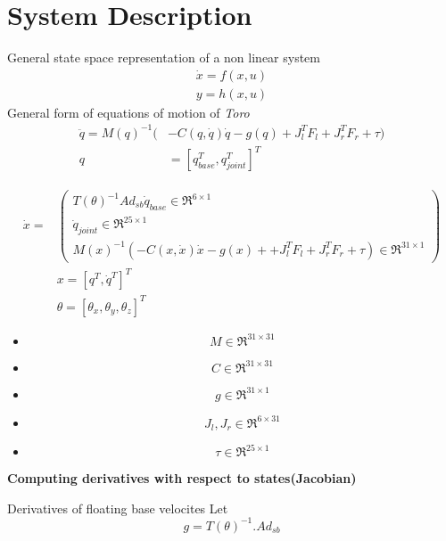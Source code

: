 \documentclass[12pt]{article}
\begin{document}
\newpage
\section{System Description}
General state space representation of a non linear system
\begin{equation}
	\begin{split}
	\dot{x} = f(x,u)\\
	y = h(x,u)
	\end{split}
\end{equation}
General form of equations of motion of \emph{Toro}
\begin{equation}
	\begin{split}
	\ddot{q} = M(q)^{-1}(&-C(q,\dot{q})\dot{q} - g(q) + J_{l}^{T}F_{l} + J_{r}^{T}F_{r} + \tau) \\
	q &= [q_{base}^{T}, q_{joint}^{T}]^{T}
	\end{split}
\end{equation}

\begin{equation}
	\begin{split}
	\dot{x} = &
	\begin{pmatrix}
	T(\theta)^{-1}Ad_{sb}\dot{q}_{base} \in \Re^{6 \times 1}  \\
	\dot{q}_{joint} \in \Re^{25 \times 1} \\
	M(x)^{-1}(-C(x,\dot{x})\dot{x} -g(x) + + J_{l}^{T}F_{l} + J_{r}^{T}F_{r} + \tau) \in \Re^{31 \times 1}	
	\end{pmatrix}
	\\&x = [q^{T},\dot{q}^{T}]^{T}
	\\&\theta = [\theta_{x},\theta_{y},\theta_{z}]^{T}
	\end{split}
\end{equation}
\begin{itemize}
\item $$M \in \Re^{31 \times 31}$$
\item $$C \in \Re^{31 \times 31}$$
\item $$g \in \Re^{31 \times 1}$$
\item $$J_{l},J_{r} \in \Re^{6 \times 31}$$
\item $$\tau \in \Re^{25 \times 1}$$
\end{itemize}
\textbf{Computing derivatives with respect to states(Jacobian)} 

Derivatives of floating base velocites
Let
$$g = T(\theta)^{-1}.Ad_{sb}$$
\end{document}
